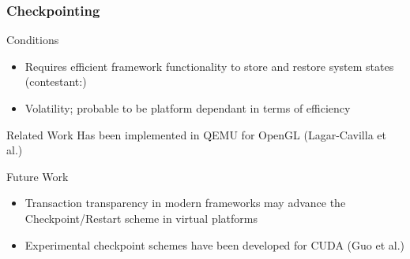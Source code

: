 \begin{frame}

\frametitle{Checkpointing}

\begin{block}{Conditions}
	\begin{itemize}
		\item Requires efficient framework functionality to store and restore system states (contestant:)
		\item Volatility; probable to be platform dependant in terms of efficiency
	\end{itemize}
\end{block}

\begin{block}{Related Work}
	Has been implemented in QEMU for OpenGL (Lagar-Cavilla et al.)
\end{block}

\begin{block}{Future Work}
	\begin{itemize}
		\item Transaction transparency in modern frameworks may advance the Checkpoint/Restart scheme in virtual platforms
		\item Experimental checkpoint schemes have been developed for CUDA (Guo et al.)
	\end{itemize}
\end{block}

\end{frame}
